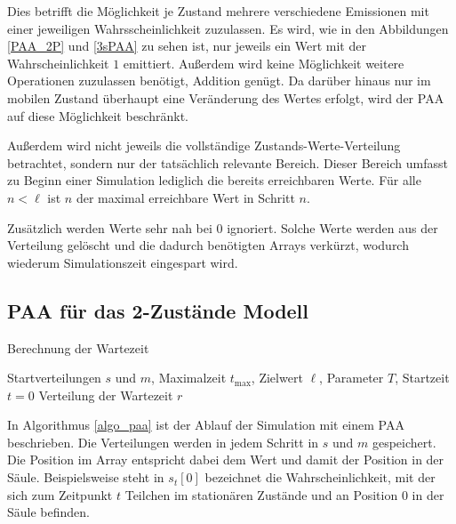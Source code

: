 Dies betrifft die Möglichkeit je Zustand mehrere verschiedene Emissionen mit einer jeweiligen Wahrsscheinlichkeit zuzulassen. Es wird, wie in den Abbildungen \ref{PAA_2P} und \ref{3sPAA} zu sehen ist, nur jeweils ein Wert mit der Wahrscheinlichkeit $1$ emittiert. Außerdem wird keine Möglichkeit weitere Operationen zuzulassen benötigt, Addition genügt. Da darüber hinaus nur im mobilen Zustand überhaupt eine Veränderung des Wertes erfolgt, wird der PAA auf diese Möglichkeit beschränkt.

Außerdem wird nicht jeweils die vollständige Zustands-Werte-Verteilung betrachtet, sondern nur der tatsächlich relevante Bereich. Dieser Bereich umfasst zu Beginn einer Simulation lediglich die bereits erreichbaren Werte. Für alle $n<\ell$ ist $n$ der maximal erreichbare Wert in Schritt $n$.

Zusätzlich werden Werte sehr nah bei $0$ ignoriert. Solche Werte werden aus der Verteilung gelöscht und die dadurch benötigten Arrays verkürzt, wodurch wiederum Simulationszeit eingespart wird.




\subsection{PAA für das 2-Zustände Modell}

\begin{algorithm}
\caption{Berechnung der Wartezeit}
\label{algo_paa}
\begin{algorithmic}[1]
\REQUIRE Startverteilungen $s$ und $m$, Maximalzeit $t_{\text{max}}$, Zielwert $\ell$, Parameter $T$, Startzeit $t=0$
\ENSURE Verteilung der Wartezeit
\ELSE
{}
\ENDIF
{}
\ENDWHILE
\RETURN $r$
\end{algorithmic}
\end{algorithm}

In Algorithmus \ref{algo_paa} ist der Ablauf der Simulation mit einem PAA beschrieben. Die Verteilungen werden in jedem Schritt in $s$ und $m$ gespeichert. Die Position im Array entspricht dabei dem Wert und damit der Position in der Säule. 
Beispielsweise steht in $s_t[0]$ bezeichnet die Wahrscheinlichkeit, mit der sich zum Zeitpunkt $t$ Teilchen im stationären Zustände und an Position $0$ in der Säule befinden.

